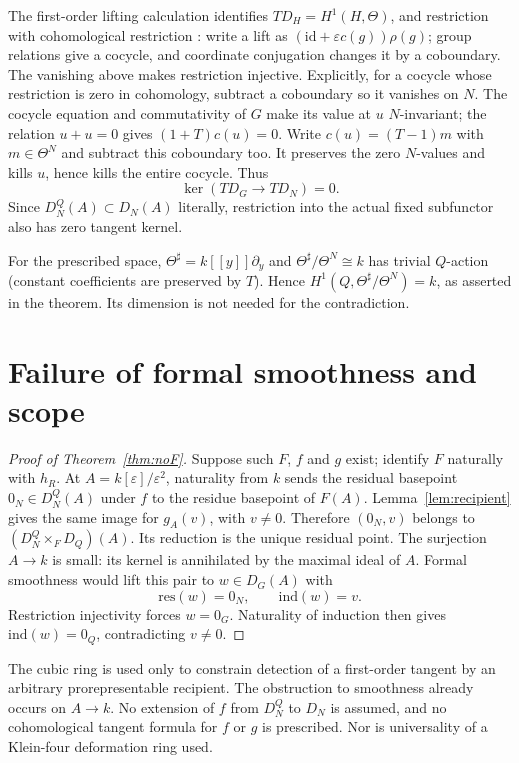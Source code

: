 \documentclass[11pt]{article}
\newcommand{\eps}{\varepsilon}
\newcommand{\Th}{\Theta}
\begin{document}
The first-order lifting calculation identifies $TD_H=H^1(H,\Th)$, and
restriction with cohomological restriction \cite[Proposition~2.4]{Byszewski}:
write a lift as $(\mathrm{id}+\eps c(g))\rho(g)$; group relations give a
cocycle, and coordinate conjugation changes it by a coboundary.
The vanishing above makes restriction injective. Explicitly, for a cocycle
whose restriction is zero in cohomology, subtract a coboundary so it vanishes
on $N$. The cocycle equation and commutativity of $G$ make its value at $u$
$N$-invariant; the relation $u+u=0$ gives $(1+T)c(u)=0$.
Write $c(u)=(T-1)m$ with $m\in\Th^N$ and subtract this coboundary too. It
preserves the zero $N$-values and kills $u$, hence kills the entire cocycle.
Thus
\[
 \ker(TD_G\longrightarrow TD_N)=0.
\]
Since $D_N^Q(A)\subset D_N(A)$ literally, restriction into the actual fixed
subfunctor also has zero tangent kernel.

For the prescribed space, $\Th^\sharp=k[[y]]\partial_y$ and
$\Th^\sharp/\Th^N\cong k$ has trivial $Q$-action (constant coefficients are
preserved by $T$). Hence $H^1(Q,\Th^\sharp/\Th^N)=k$, as asserted in the
theorem. Its dimension is not needed for the contradiction.

\section{Failure of formal smoothness and scope}
\begin{proof}[Proof of Theorem~\ref{thm:noF}]
Suppose such $F$, $f$ and $g$ exist; identify $F$ naturally with $h_R$.
At $A=k[\eps]/\eps^2$, naturality from $k$ sends the residual basepoint
$0_N\in D_N^Q(A)$ under $f$ to the residue basepoint of $F(A)$.
Lemma~\ref{lem:recipient} gives the same image for $g_A(v)$, with $v\ne0$.
Therefore $(0_N,v)$ belongs to $(D_N^Q\times_F D_Q)(A)$.
Its reduction is the unique residual point. The surjection $A\to k$ is
small: its kernel is annihilated by the maximal ideal of $A$.
Formal smoothness would lift this pair to $w\in D_G(A)$ with
\[
 \mathrm{res}(w)=0_N,\qquad\mathrm{ind}(w)=v.
\]
Restriction injectivity forces $w=0_G$. Naturality of induction then gives
$\mathrm{ind}(w)=0_Q$, contradicting $v\ne0$.
\end{proof}

The cubic ring is used only to constrain detection of a first-order tangent
by an arbitrary prorepresentable recipient. The obstruction to smoothness
already occurs on $A\to k$. No extension of $f$ from $D_N^Q$ to $D_N$ is
assumed, and no cohomological tangent formula for $f$ or $g$ is prescribed.
Nor is universality of a Klein-four deformation ring used.
\end{document}
